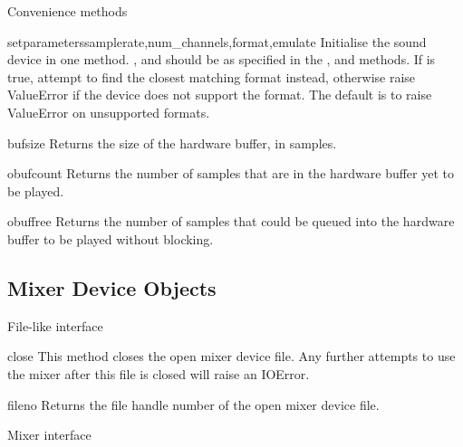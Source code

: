 Convenience methods

\begin{methoddesc}{setparameters}{samplerate,num_channels,format,emulate}
Initialise the sound device in one method.  ,
 and  should be as specified in the
,  and 
methods.  If  is true, attempt to find the closest matching
format instead, otherwise raise ValueError if the device does not
support the format.  The default is to raise ValueError on unsupported
formats.
\end{methoddesc}

\begin{methoddesc}{bufsize}{}
Returns the size of the hardware buffer, in samples.
\end{methoddesc}

\begin{methoddesc}{obufcount}{}
Returns the number of samples that are in the hardware buffer yet to be
played.
\end{methoddesc}

\begin{methoddesc}{obuffree}{}
Returns the number of samples that could be queued into the hardware
buffer to be played without blocking.
\end{methoddesc}

\subsection{Mixer Device Objects \label{mixer-device-objects}}

File-like interface

\begin{methoddesc}{close}{}
This method closes the open mixer device file.  Any further attempts to
use the mixer after this file is closed will raise an IOError.
\end{methoddesc}

\begin{methoddesc}{fileno}{}
Returns the file handle number of the open mixer device file.
\end{methoddesc}

Mixer interface

